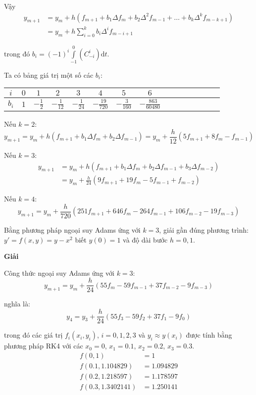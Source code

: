 Vậy
\begin{align*}
	y_{m+1}&=y_m+h(f_{m+1}+b_1 \Delta f_m+b_2 \Delta^2 f_{m-1}+\ldots+b_k \Delta^k f_{m-k+1})\\
	       &=y_m+h\sum\limits_{i=0}^{k} b_i\Delta^i f_{m-i+1}
\end{align*}

trong đó $b_i=(-1)^i\int\limits_{-1}^{0} \left(C_{-i}^i\right)\mathrm{d}t$.\par

Ta có bảng giá trị một số các $b_i$:
\begin{longtable}{|c|Sc|Sc|Sc|Sc|Sc|Sc|Sc|}\hline
	$i$   & $0$ & $1$        & $2$             & $3$             & $4$               & $5$              & $6$\\\hline
	\endhead
	$b_i$ & $1$ & $-\frac12$ & $-\frac{1}{12}$ & $-\frac{1}{24}$ & $-\frac{19}{720}$ & $-\frac{3}{160}$ & $-\frac{863}{60480}$\\\hline
\end{longtable}

Nếu $k=2$:
$$y_{m+1}=y_m+h(f_{m+1}+b_1\Delta f_m+b_2\Delta f_{m-1})=y_m+\frac{h}{12}(5f_{m+1}+8f_m-f_{m-1})$$

Nếu $k=3$:
\begin{align*}
	y_{m+1}&=y_m+h(f_{m+1}+b_1\Delta f_m+b_2\Delta f_{m-1}+b_3\Delta f_{m-2})\\
	       &=y_m+\frac{h}{24}(9f_{m+1}+19f_m-5f_{m-1}+f_{m-2})
\end{align*}

Nếu $k=4$:
$$y_{m+1}=y_m+\frac{h}{720}(251f_{m+1}+646f_m-264f_{m-1}+106f_{m-2}-19f_{m-3})$$

\begin{example}
Bằng phương pháp ngoại suy Adams ứng với $k=3$, giải gần đúng phương trình: $y'=f(x,y)=y-x^2$ biết $y(0)=1$ và độ dài bước $h=0,1$.
\end{example}

\textbf{Giải}\par
Công thức ngoại suy Adams ứng với $k=3$:\\
$$y_{m+1}=y_m+\frac{h}{24} (55f_m-59f_{m-1}+37f_{m-2}-9f_{m-3})$$

nghĩa là:
$$y_4=y_3+\frac{h}{24} (55f_3-59f_2+37f_1-9f_0)$$

trong đó các giá trị $f_i(x_i,y_i)$, $i=0,1,2,3$ và $y_i\approx y(x_i)$ được tính bằng phương pháp RK4 với các $x_0=0$, $x_1=0.1$, $x_2=0.2$, $x_3=0.3$.
\begin{align*}
	f(0,1)          &=1\\
	f(0.1,1.104829) &=1.094829\\
	f(0.2,1.218597) &=1.178597\\
	f(0.3,1.3402141)&=1.250141
\end{align*}

